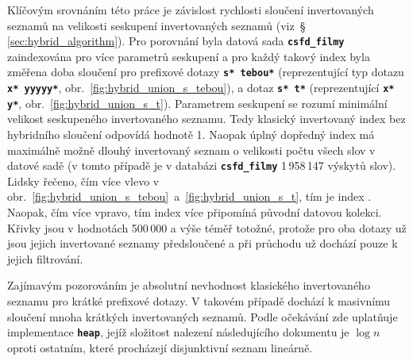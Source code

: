 \documentclass[11pt,letterpaper,oneside,openright]{book}
\newcommand{\bftt}[1]{\texttt{\textbf{#1}}}
\begin{document}
Klíčovým srovnáním této práce je závislost rychlosti sloučení invertovaných
seznamů na velikosti seskupení invertovaných seznamů
(viz~\S\,\ref{sec:hybrid_algorithm}).  Pro porovnání byla datová sada
\bftt{csfd\_filmy} zaindexována pro více parametrů seskupení a pro každý takový
index byla změřena doba sloučení pro prefixové dotazy \bftt{s* tebou*}
(reprezentující typ dotazu \bftt{x* yyyyy*},
obr.~\ref{fig:hybrid_union_s_tebou}), a dotaz \bftt{s* t*} (reprezentující
\bftt{x* y*}, obr.~\ref{fig:hybrid_union_s_t}). Parametrem seskupení se rozumí
minimální velikost seskupeného invertovaného seznamu. Tedy klasický invertovaný
index bez hybridního sloučení odpovídá hodnotě 1. Naopak úplný dopředný index
má maximálně možně dlouhý invertovaný seznam o velikosti počtu všech slov v
datové sadě (v tomto případě je v databázi \bftt{csfd\_filmy} 1\,958\,147
výskytů slov). Lidsky řečeno, čím více vlevo v
obr.~\ref{fig:hybrid_union_s_tebou}~a~\ref{fig:hybrid_union_s_t}, tím je index
. Naopak, čím více vpravo, tím index více připomíná
původní datovou kolekci. Křivky jsou v hodnotách 500\,000 a výše téměř totožné,
protože pro oba dotazy už jsou jejich invertované seznamy předsloučené a při
průchodu už dochází pouze k jejich filtrování.

Zajímavým pozorováním je absolutní nevhodnost klasického invertovaného seznamu
pro krátké prefixové dotazy. V takovém případě dochází k masivnímu sloučení
mnoha krátkých invertovaných seznamů. Podle očekávání zde uplatňuje
implementace \bftt{heap}, jejíž složitost nalezení následujícího dokumentu je
$\log n$ oproti ostatním, které procházejí disjunktivní seznam lineárně.
\end{document}
